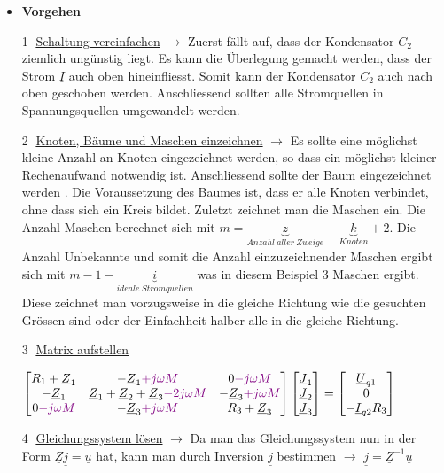 \begin{itemize}
	\item \textbf{Vorgehen}
	\item[\textcircled{1}] \underline{Schaltung vereinfachen} $\rightarrow$ Zuerst fällt auf, dass der Kondensator $C_2$ ziemlich ungünstig liegt. Es kann die Überlegung gemacht werden, dass der Strom $\underline{I}$ auch oben hineinfliesst. Somit kann der Kondensator $C_2$ auch nach oben geschoben werden. Anschliessend sollten alle Stromquellen in Spannungsquellen umgewandelt werden.
	 \item[\textcircled{2}] \underline{Knoten, Bäume und Maschen einzeichnen} $\rightarrow$ Es sollte eine möglichst kleine Anzahl an Knoten \textcolor{brown}{\textbullet}  eingezeichnet werden, so dass ein möglichst kleiner Rechenaufwand notwendig ist. Anschliessend sollte der Baum eingezeichnet werden \textcolor{green}{\textemdash}. Die Voraussetzung des Baumes ist, dass er alle Knoten verbindet, ohne dass sich ein Kreis bildet. Zuletzt zeichnet man die Maschen ein. Die Anzahl Maschen berechnet sich mit $\boxed{m=\underbrace{z}_{Anzahl\ aller\ Zweige}-\underbrace{k}_{Knoten}+2}$. Die Anzahl Unbekannte und somit die Anzahl einzuzeichnender Maschen ergibt sich mit $\boxed{m-1-\underbrace{i}_{ideale\ Stromquellen}}$  was in diesem Beispiel 3 Maschen ergibt. Diese zeichnet man vorzugsweise in die gleiche Richtung wie die gesuchten Grössen sind oder der Einfachheit halber alle in die gleiche Richtung.
	  \item[\textcircled{3}] \underline{Matrix aufstellen}
	  \item[] $\left[ \begin{matrix}
	  R_1+\underline{Z}_1 	& -\underline{Z}_1\textcolor{violet}{+j\omega M} & 0\textcolor{violet}{-j\omega M} \\ 
	  -\underline{Z}_1	& \underline{Z}_1+\underline{Z}_2+\underline{Z}_3\textcolor{violet}{-2j\omega M} & -\underline{Z}_3\textcolor{violet}{+j\omega M}  \\ 
	  0\textcolor{violet}{-j\omega M}	& -\underline{Z}_3\textcolor{violet}{+j\omega M} & R_3+\underline{Z}_3
	  \end{matrix} \right]
  \left[\begin{matrix}
 \underline{J}_1 \\ \underline{J}_2
\\ \underline{J}_3

\end{matrix} \right]=\left[\begin{matrix}
\underline{U}_{q1}\\ 
0\\ -\underline{I}_{q2}R_3

\end{matrix}\right] $
\item[\textcircled{4}] \underline{Gleichungssystem lösen} $\rightarrow$ Da man das Gleichungssystem nun in der Form $\underline{Z}\underline{j}=\underline{u}$ hat, kann man durch Inversion $\underline{j}$ bestimmen $\rightarrow$ $\underline{j}=\underline{Z}^{-1}\underline{u}$ 
\end{itemize}

